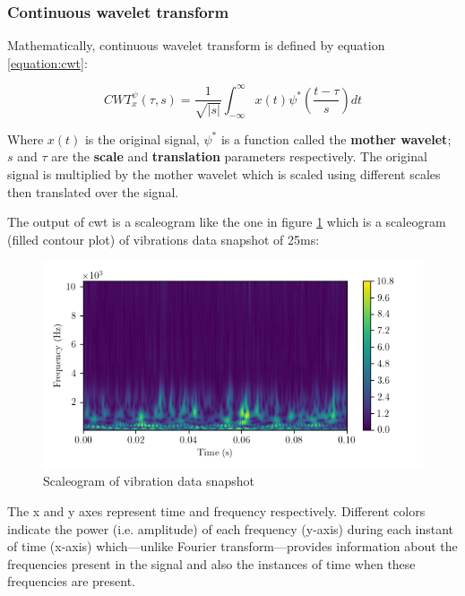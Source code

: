 \subsubsection{Continuous wavelet transform}
Mathematically, continuous wavelet transform is defined by equation \ref{equation:cwt}:

\begin{equation}
    CWT_x^\psi(\tau, s)=\frac{1}{\sqrt{|s|}}\int_{-\infty}^{\infty}x(t)\psi^* \left(\frac{t-\tau}{s}\right)dt
    \label{equation:cwt}
\end{equation}

Where $x(t)$ is the original signal, $\psi^*$ is a function called the \textbf{mother wavelet}; $s$ and $\tau$ are the \textbf{scale} and \textbf{translation} parameters respectively. The original signal is multiplied by the mother wavelet which is scaled using different scales then translated over the signal.

The output of \acrshort{cwt} is a scaleogram like the one in figure \ref{fig:scaleogram} which is a scaleogram (filled contour plot) of vibrations data snapshot of 25ms:

\begin{figure}[H]
    \centering
    \includegraphics{figures/scaleogram.png}
    \caption{Scaleogram of vibration data snapshot}
    \label{fig:scaleogram}
\end{figure}

The x and y axes represent time and frequency respectively. Different colors indicate the power (i.e. amplitude) of each frequency (y-axis) during each instant of time (x-axis) which—unlike Fourier transform—provides information about the frequencies present in the signal and also the instances of time when these frequencies are present.

